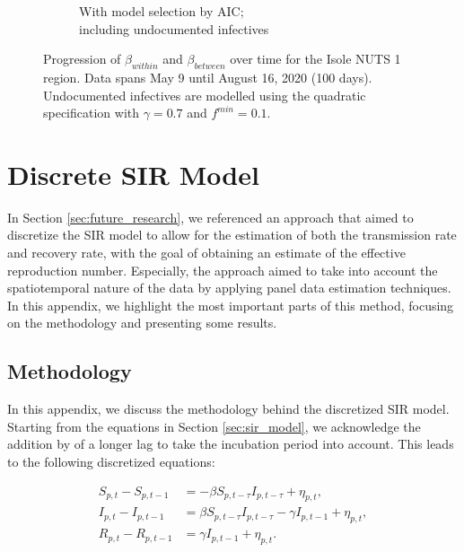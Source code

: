 \documentclass[12pt]{article}
\begin{document}
\begin{appendices}
\begin{figure}[H]
\begin{subfigure}{\textwidth}
    	      \caption{With model selection by AIC; \\ including undocumented infectives}
    	      \label{fig:beta_between_over_time_isole_aic_undoc}
    	    \end{subfigure}
    	    \caption{Progression of $\beta_{within}$ and $\beta_{between}$ over time for the Isole NUTS 1 region. Data spans May 9 until August 16, 2020 (100 days). Undocumented infectives are modelled using the quadratic specification with $\gamma = 0.7$ and $f^{min}=0.1$.}
    	    \label{fig:beta_between_over_time_isole}
        \end{figure}
		
		\newpage
		\section{Discrete SIR Model} \label{app:discrete_SIR}
		In Section \ref{sec:future_research}, we referenced an approach that aimed to discretize the SIR model to allow for the estimation of both the transmission rate and recovery rate, with the goal of obtaining an estimate of the effective reproduction number. Especially, the approach aimed to take into account the spatiotemporal nature of the data by applying panel data estimation techniques. In this appendix, we highlight the most important parts of this method, focusing on the methodology and presenting some results.
		
		\subsection{Methodology} \label{sapp:discrete_SIR_methodology}
		In this appendix, we discuss the methodology behind the discretized SIR model. Starting from the equations in Section \ref{sec:sir_model}, we acknowledge the addition by \textcite{adda2016economic} of a longer lag to take the incubation period into account. This leads to the following discretized equations:
		
		\begin{align}
        	S_{p,t} - S_{p,t-1} &= -\beta S_{p,t-\tau}I_{p,t-\tau} + \eta_{p,t}, \label{eq:discrete_SIR_model_S}\\
        	I_{p,t} - I_{p,t-1} &= \beta S_{p,t-\tau}I_{p,t-\tau} - \gamma I_{p,t-1} + \eta_{p,t}, \label{eq:discrete_SIR_model_I}\\
        	R_{p,t} - R_{p,t-1} &= \gamma I_{p,t-1} + \eta_{p,t}. \label{eq:discrete_SIR_model_R}
    	\end{align}
	

\end{appendices}
\end{document}
